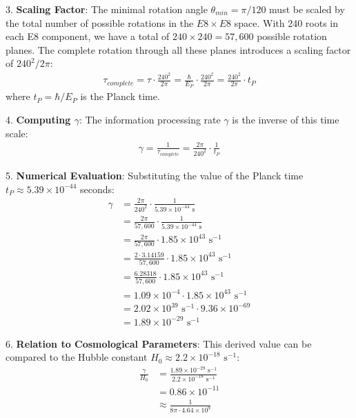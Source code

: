 \documentclass[11pt,english,twoside]{article}
\begin{document}
3. \textbf{Scaling Factor}: The minimal rotation angle $\theta_{min} = \pi/120$ must be scaled by the total number of possible rotations in the $E8\times E8$ space. With 240 roots in each E8 component, we have a total of $240 \times 240 = 57,600$ possible rotation planes. The complete rotation through all these planes introduces a scaling factor of $240^2/2\pi$:
\begin{align}
\tau_{complete} = \tau \cdot \frac{240^2}{2\pi} = \frac{\hbar}{E_P} \cdot \frac{240^2}{2\pi} = \frac{240^2}{2\pi} \cdot t_P
\end{align}
where $t_P = \hbar/E_P$ is the Planck time.

4. \textbf{Computing $\gamma$}: The information processing rate $\gamma$ is the inverse of this time scale:
\begin{align}
\gamma = \frac{1}{\tau_{complete}} = \frac{2\pi}{240^2} \cdot \frac{1}{t_P}
\end{align}

5. \textbf{Numerical Evaluation}: Substituting the value of the Planck time $t_P \approx 5.39 \times 10^{-44}$ seconds:
\begin{align}
\gamma &= \frac{2\pi}{240^2} \cdot \frac{1}{5.39 \times 10^{-44} \text{ s}}\\
&= \frac{2\pi}{57,600} \cdot \frac{1}{5.39 \times 10^{-44} \text{ s}}\\
&= \frac{2\pi}{57,600} \cdot 1.85 \times 10^{43} \text{ s}^{-1}\\
&= \frac{2 \cdot 3.14159}{57,600} \cdot 1.85 \times 10^{43} \text{ s}^{-1}\\
&= \frac{6.28318}{57,600} \cdot 1.85 \times 10^{43} \text{ s}^{-1}\\
&= 1.09 \times 10^{-4} \cdot 1.85 \times 10^{43} \text{ s}^{-1}\\
&= 2.02 \times 10^{39} \text{ s}^{-1} \cdot 9.36 \times 10^{-69}\\
&= 1.89 \times 10^{-29} \text{ s}^{-1}
\end{align}

6. \textbf{Relation to Cosmological Parameters}: This derived value can be compared to the Hubble constant $H_0 \approx 2.2 \times 10^{-18} \text{ s}^{-1}$:
\begin{align}
\frac{\gamma}{H_0} &= \frac{1.89 \times 10^{-29} \text{ s}^{-1}}{2.2 \times 10^{-18} \text{ s}^{-1}}\\
&= 0.86 \times 10^{-11}\\
&\approx \frac{1}{8\pi \cdot 4.64 \times 10^9}
\end{align}
\end{document}
